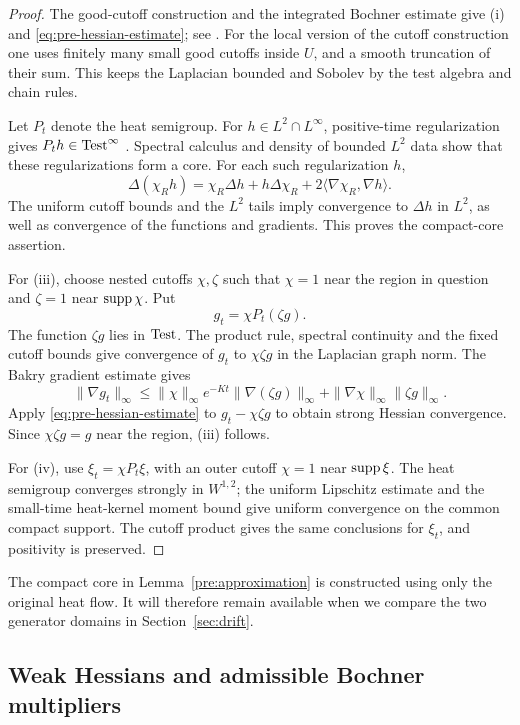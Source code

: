 \begin{proof}
The good-cutoff construction and the integrated Bochner estimate give
\textup{(i)} and \eqref{eq:pre-hessian-estimate}; see
\cite[Appendix~A, Lemma~A.2 and Equation~(A.13)]{GigliTamanini2021}.
For the local version of the cutoff construction one uses finitely
many small good cutoffs inside \(U\), and a smooth truncation of their
sum. This keeps the Laplacian bounded and Sobolev by the test
algebra and chain rules.

Let \(P_t\) denote the heat semigroup. For \(h\in L^2\cap L^\infty\),
positive-time regularization gives
\(P_th\in\operatorname{Test}^\infty\)
\cite[Appendix~A, Equation~(A.7)]{GigliTamanini2021}.
Spectral calculus and density of bounded \(L^2\) data show that these
regularizations form a core. For each such regularization \(h\),
\[
\Delta(\chi_Rh)
=\chi_R\Delta h+h\Delta\chi_R
+2\langle\nabla\chi_R,\nabla h\rangle.
\]
The uniform cutoff bounds and the \(L^2\) tails imply convergence
to \(\Delta h\) in \(L^2\), as well as convergence of the functions
and gradients. This proves the compact-core assertion.

For \textup{(iii)}, choose nested cutoffs \(\chi,\zeta\) such that
\(\chi=1\) near the region in question and \(\zeta=1\) near
\(\operatorname{supp}\chi\). Put
\[
g_t=\chi P_t(\zeta g).
\]
The function \(\zeta g\) lies in \(\operatorname{Test}\). The product rule,
spectral continuity and the fixed cutoff bounds give convergence
of \(g_t\) to \(\chi\zeta g\) in the Laplacian graph norm.
The Bakry gradient estimate gives
\[
\|\nabla g_t\|_\infty
\le \|\chi\|_\infty e^{-Kt}\|\nabla(\zeta g)\|_\infty
+\|\nabla\chi\|_\infty\|\zeta g\|_\infty.
\]
Apply \eqref{eq:pre-hessian-estimate} to
\(g_t-\chi\zeta g\) to obtain strong Hessian convergence.
Since \(\chi\zeta g=g\) near the region, \textup{(iii)} follows.

For \textup{(iv)}, use \(\xi_t=\chi P_t\xi\), with an outer
cutoff \(\chi=1\) near \(\operatorname{supp}\xi\).
The heat semigroup converges strongly in \(W^{1,2}\);
the uniform Lipschitz estimate and the small-time heat-kernel
moment bound give uniform convergence on the common compact
support. The cutoff product gives the same conclusions for
\(\xi_t\), and positivity is preserved.
\end{proof}


The compact core in Lemma~\ref{pre:approximation} is constructed
using only the original heat flow. It will therefore remain
available when we compare the two generator domains in
Section~\ref{sec:drift}.

\subsection{Weak Hessians and admissible Bochner multipliers}

